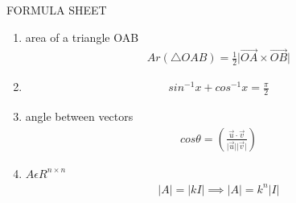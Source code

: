 \documentclass[]{article}
\begin{document}
\begin{center}
    FORMULA SHEET
\end{center}
\begin{enumerate}[label=\thesubsection.\arabic*, ref=\thesubsection.\theenumi]



\item area of a triangle OAB 
\begin{align}
    Ar(\triangle OAB)= \frac{1}{2}\vert{}\overrightarrow{OA}\times \overrightarrow{OB}\vert{} \label{eq:ee26btech11222-prob 1}
\end{align}
\item 
\begin{align}
    sin^{-1}x+cos^{-1}x=\frac{\pi}{2} \label{eq:ee26btech11222-prob 2}
\end{align}
\item angle between vectors
\begin{align}
    cos\theta=\left(\frac{\overrightarrow{u}\cdot\overrightarrow{v}}{\vert{\overrightarrow{u}\vert{}\vert{\overrightarrow{v}\vert{}}}}\right) \label{eq:ee26btech11222-prob 8}
\end{align}

\item $A\epsilon R^{n\times n}$
\begin{align} 
    \vert{A}\vert{}=\vert{kI}\vert{} \implies \vert{A}\vert{}= k^n\vert{I}\vert{} \label{eq:ee26btech11222-prob 9}
\end{align}


\end{enumerate}
\end{document}
